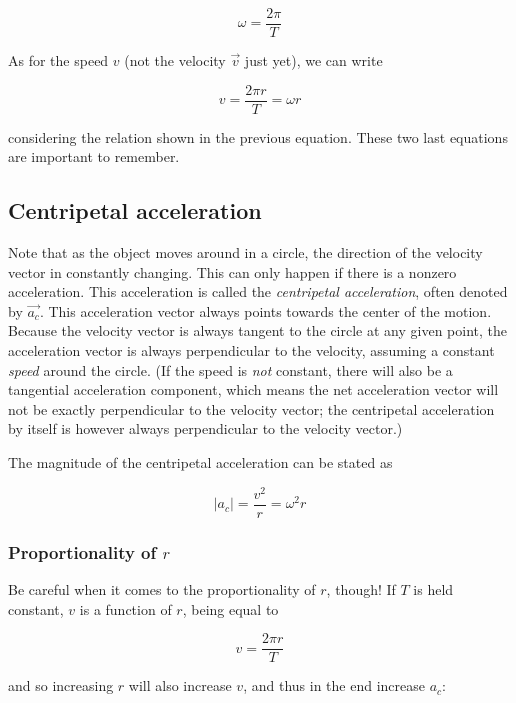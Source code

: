 \documentclass[12pt,a4paper]{report}
\begin{document}
\begin{equation}
\omega = \frac{2 \pi}{T}
\end{equation}

As for the speed $v$ (not the velocity $\vec{v}$ just yet), we can write

\begin{equation}
v = \frac{2 \pi r}{T} = \omega r
\end{equation}

considering the relation shown in the previous equation. These two last equations are important to remember.

\subsection{Centripetal acceleration}

Note that as the object moves around in a circle, the direction of the velocity vector in constantly changing. This can only happen if there is a nonzero acceleration. This acceleration is called the \emph{centripetal acceleration}, often denoted by $\vec{a_c}$. This acceleration vector always points towards the center of the motion. Because the velocity vector is always tangent to the circle at any given point, the acceleration vector is always perpendicular to the velocity, assuming a constant \emph{speed} around the circle. (If the speed is \emph{not} constant, there will also be a tangential acceleration component, which means the net acceleration vector will not be exactly perpendicular to the velocity vector; the centripetal acceleration by itself is however always perpendicular to the velocity vector.)

The magnitude of the centripetal acceleration can be stated as

\begin{equation}
|a_c| = \frac{v^2}{r} = \omega^2 r
\end{equation}

\subsubsection{Proportionality of $r$}
Be careful when it comes to the proportionality of $r$, though! If $T$ is held constant, $v$ is a function of $r$, being equal to

\begin{equation}
v = \frac{2 \pi r}{T}
\end{equation}

and so increasing $r$ will also increase $v$, and thus in the end increase $a_c$:
\end{document}
